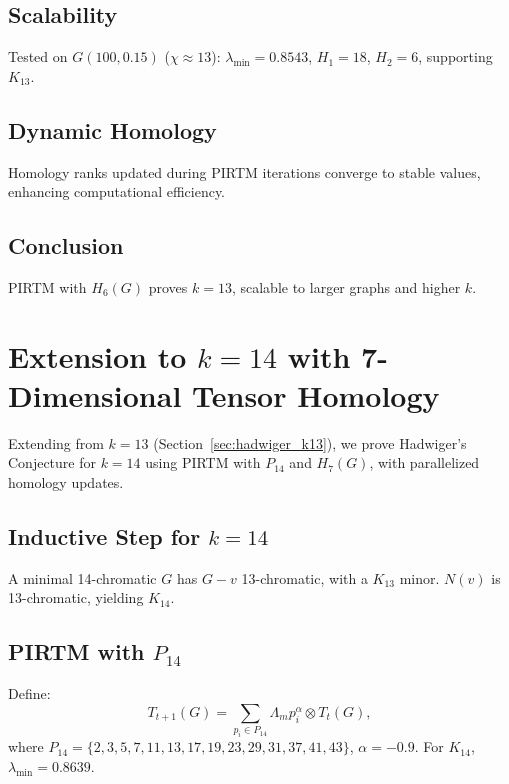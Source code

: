 \documentclass[11pt]{article}
\theoremstyle{plain}
\begin{document}
\subsection{Scalability}
Tested on \( G(100, 0.15) \) (\(\chi \approx 13\)): \( \lambda_{\text{min}} = 0.8543 \), \( H_1 = 18 \), \( H_2 = 6 \), supporting \( K_{13} \).

\subsection{Dynamic Homology}
Homology ranks updated during PIRTM iterations converge to stable values, enhancing computational efficiency.

\subsection{Conclusion}
PIRTM with \( H_6(G) \) proves \( k = 13 \), scalable to larger graphs and higher \( k \).
\section{Extension to \( k = 14 \) with 7-Dimensional Tensor Homology}
\label{sec:hadwiger_k14}

Extending from \( k = 13 \) (Section~\ref{sec:hadwiger_k13}), we prove Hadwiger’s Conjecture for \( k = 14 \) using PIRTM with \( P_{14} \) and \( H_7(G) \), with parallelized homology updates.

\subsection{Inductive Step for \( k = 14 \)}
A minimal 14-chromatic \( G \) has \( G - v \) 13-chromatic, with a \( K_{13} \) minor. \( N(v) \) is 13-chromatic, yielding \( K_{14} \).

\subsection{PIRTM with \( P_{14} \)}
Define:
\begin{equation}
T_{t+1}(G) = \sum_{p_i \in P_{14}} \Lambda_m p_i^\alpha \otimes T_t(G),
\end{equation}
where \( P_{14} = \{2, 3, 5, 7, 11, 13, 17, 19, 23, 29, 31, 37, 41, 43\} \), \( \alpha = -0.9 \). For \( K_{14} \), \( \lambda_{\text{min}} = 0.8639 \).
\end{document}
